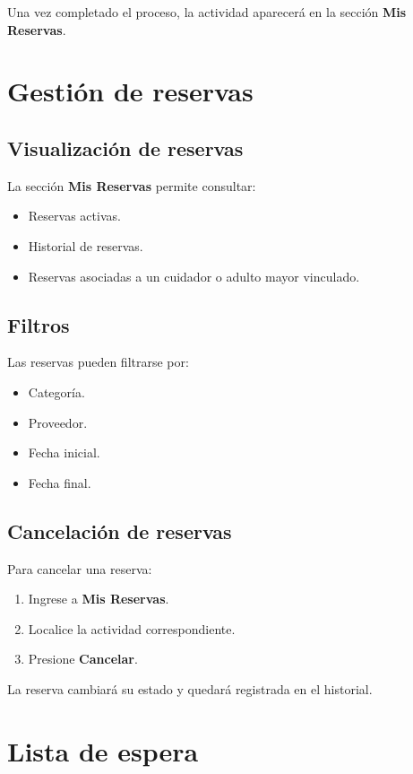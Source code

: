 \documentclass[12pt,a4paper]{article}
\begin{document}
Una vez completado el proceso, la actividad aparecerá en la sección \textbf{Mis Reservas}.

\section{Gestión de reservas}

\subsection{Visualización de reservas}

La sección \textbf{Mis Reservas} permite consultar:

\begin{itemize}
\item Reservas activas.
\item Historial de reservas.
\item Reservas asociadas a un cuidador o adulto mayor vinculado.
\end{itemize}

\subsection{Filtros}

Las reservas pueden filtrarse por:

\begin{itemize}
\item Categoría.
\item Proveedor.
\item Fecha inicial.
\item Fecha final.
\end{itemize}

\subsection{Cancelación de reservas}

Para cancelar una reserva:

\begin{enumerate}
\item Ingrese a \textbf{Mis Reservas}.
\item Localice la actividad correspondiente.
\item Presione \textbf{Cancelar}.
\end{enumerate}

La reserva cambiará su estado y quedará registrada en el historial.

\section{Lista de espera}
\end{document}

